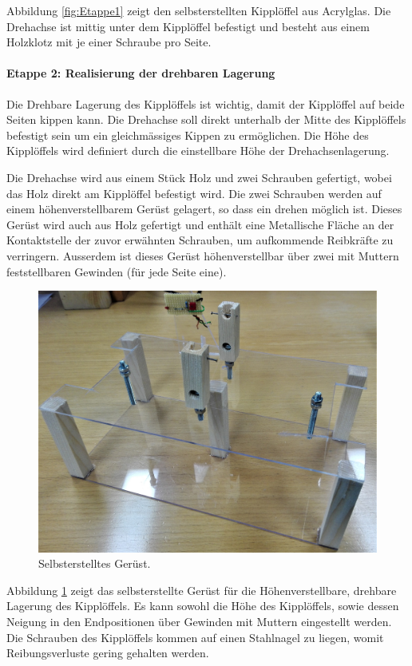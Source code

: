 Abbildung \ref{fig:Etappe1} zeigt den selbsterstellten Kipplöffel aus Acrylglas. Die Drehachse ist mittig unter dem Kipplöffel befestigt und besteht aus einem Holzklotz mit je einer Schraube pro Seite.

\paragraph{Etappe 2: Realisierung der drehbaren Lagerung}
Die Drehbare Lagerung des Kipplöffels ist wichtig, damit der Kipplöffel auf beide Seiten kippen kann. Die Drehachse soll direkt unterhalb der Mitte des Kipplöffels befestigt sein um ein gleichmässiges Kippen zu ermöglichen. Die Höhe des Kipplöffels wird definiert durch die einstellbare Höhe der Drehachsenlagerung. 

Die Drehachse wird aus einem Stück Holz und zwei Schrauben gefertigt, wobei das Holz direkt am Kipplöffel befestigt wird. Die zwei Schrauben werden auf einem höhenverstellbarem Gerüst gelagert, so dass ein drehen möglich ist. Dieses Gerüst wird auch aus Holz gefertigt und enthält eine Metallische Fläche an der Kontaktstelle der zuvor erwähnten Schrauben, um aufkommende Reibkräfte zu verringern. Ausserdem ist dieses Gerüst höhenverstellbar über zwei mit Muttern feststellbaren Gewinden (für jede Seite eine). 

\begin{figure}[h]
\centering
\includegraphics[width=0.8\linewidth]{graphics/Etappe2.jpg}
\caption{Selbsterstelltes Gerüst.}
\label{fig:Etappe2}
\end{figure}

Abbildung \ref{fig:Etappe2} zeigt das selbsterstellte Gerüst für die Höhenverstellbare, drehbare Lagerung des Kipplöffels. Es kann sowohl die Höhe des Kipplöffels, sowie dessen Neigung in den Endpositionen über Gewinden mit Muttern eingestellt werden. Die Schrauben des Kipplöffels kommen auf einen Stahlnagel zu liegen, womit Reibungsverluste gering gehalten werden.

